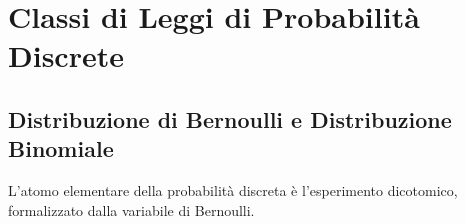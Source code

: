 \chapter{Classi di Leggi di Probabilità Discrete}
\label{cap:classi_di_leggi_discrete}

\begin{abstract}
Il presente capitolo presenta una rassegna sistematica ed enciclopedica delle principali famiglie di variabili aleatorie discrete impiegate nella modellazione ingegneristica, gestionale e fisica. Per ciascuna distribuzione viene illustrato il processo generativo microscopico sottostante, la funzione di massa di probabilità (PMF), la funzione di ripartizione (CDF) e la derivazione analitica dei momenti teorici (valore atteso e varianza). Si approfondiscono la proprietà fondamentale di assenza di memoria della legge Geometrica, il Teorema di Poisson per eventi rari (con dimostrazione rigorosa del passaggio al limite dalla Binomiale), il campionamento ipergeometrico da popolazioni finite senza reinserimento con fattore di correzione FPCF e la Binomiale Negativa. Il capitolo si conclude con una tabella comparativa sinottica ad alta consultabilità.
\end{abstract}

\section{Distribuzione di Bernoulli e Distribuzione Binomiale}
\label{sec:bernoulli_binomiale}

L'atomo elementare della probabilità discreta è l'esperimento dicotomico, formalizzato dalla variabile di Bernoulli.

